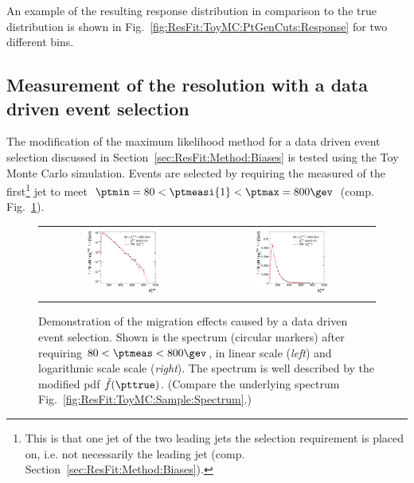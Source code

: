 An example of the resulting response distribution in comparison to the true
distribution is shown in Fig.~\ref{fig:ResFit:ToyMC:PtGenCuts:Response} for
two different \pttrue bins.


\subsection{Measurement of the resolution with a data driven event
  selection}\label{sec:ResFit:ToyMC:PtCaloCuts}

The modification of the maximum likelihood method for a data driven
event selection discussed in Section~\ref{sec:ResFit:Method:Biases} is
tested using the Toy Monte Carlo simulation.
Events are selected by requiring the measured \pt of the
first\footnote{This is that one jet of the two leading jets the
  selection requirement is placed on, i.e. not necessarily the leading
  jet (comp. Section~\ref{sec:ResFit:Method:Biases}).} jet to
meet \mbox{$\ptmin = 80 < \ptmeasi{1} < \ptmax = 800\gev$} (comp. Fig.~\ref{fig:ResFit:ToyMC:PtCuts:Spectrum}).

\begin{figure}[ht]
  \begin{center}
    \begin{tabular}{cc}
     \includegraphics[width=0.45\textwidth]{figures/resFit_ToyMC_PtCuts_SpectrumLog} &
     \includegraphics[width=0.45\textwidth]{figures/resFit_ToyMC_PtCuts_SpectrumLinear} \\
   \end{tabular}
 \end{center}
  \caption{Demonstration of the migration effects caused by a data
    driven event selection.
    Shown is the \pttrue spectrum (circular markers) after
    requiring \mbox{$80 < \ptmeas < 800\gev$}, in linear scale
    (\textit{left}) and logarithmic scale scale (\textit{right}).
    The spectrum is well described by the modified pdf
    $\tilde{f}(\pttrue)$.
    (Compare the underlying spectrum Fig.~\ref{fig:ResFit:ToyMC:Sample:Spectrum}.)
  }
  \label{fig:ResFit:ToyMC:PtCuts:Spectrum}
\end{figure}


